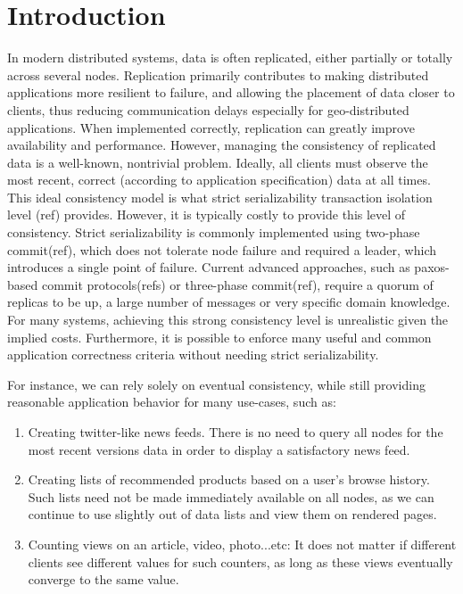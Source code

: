 

\section{Introduction}

In modern distributed systems, data is often replicated, either partially or totally 
across several nodes. Replication primarily contributes to making distributed 
applications more resilient to failure, and allowing the placement of data closer to clients, 
thus reducing communication delays especially for geo-distributed applications. 
When implemented correctly, replication can greatly improve availability and performance.
However, managing the consistency of replicated data is a well-known, nontrivial
problem. Ideally, all clients must observe the most recent, correct (according to
application specification) data at all times. This ideal consistency model is what
strict serializability transaction isolation level (ref) provides. However, it
is typically costly to provide this level of consistency.  Strict
serializability is commonly implemented using two-phase commit(ref), which does not
tolerate node failure and required a leader, which introduces a single point of
failure. Current advanced
approaches, such as paxos-based commit protocols(refs) or three-phase commit(ref),
require a quorum of replicas to be up, a large number of messages or very
specific domain knowledge. \\  %

For many systems, achieving this strong consistency level is unrealistic given
the implied costs. Furthermore, it is possible to enforce many useful and common
application correctness criteria without needing strict serializability. 

For instance, we can rely solely on eventual consistency, while still providing
reasonable application behavior for many use-cases, such as:

\begin{enumerate}
\item Creating twitter-like news feeds. There is no need to query all nodes for
the most recent versions data in order to display a satisfactory news feed.

\item Creating lists of recommended products based on a user's browse history.
Such lists need not be made immediately available on all nodes, as we can
continue to use slightly out of data lists and view them on rendered pages.

\item Counting views on an article, video, photo...etc: It does not matter if
different clients see different values for such counters, as long as these
views eventually converge to the same value.
\end{enumerate}

